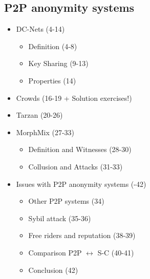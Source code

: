\documentclass[../overview.tex]{subfiles}
\begin{document}
\subsection{P2P anonymity systems}
\begin{itemize}
	\item DC-Nets (4-14)
			\begin{itemize}
					\item Definition (4-8)
					\item Key Sharing (9-13) 
					\item Properties (14)
			\end{itemize}
	\item Crowds (16-19 + Solution exercises!)
	\item Tarzan (20-26)
	\item MorphMix (27-33)
			\begin{itemize}
					\item Definition and Witnesses (28-30)
					\item Collusion and Attacks (31-33)
			\end{itemize}
	\item Issues with P2P anonymity systems (-42)
			\begin{itemize}
					\item Other P2P systems (34) 
					\item Sybil attack (35-36)
					\item Free riders and reputation (38-39)
					\item Comparison P2P $\leftrightarrow$ S-C (40-41)
					\item Conclusion (42)
			\end{itemize}
\end{itemize}
\end{document}
